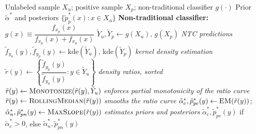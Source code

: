 \documentclass{article}
\begin{document}
\begin{algorithm}[!h]
\renewcommand{\algorithmicrequire}{\textbf{Input:}} %
\renewcommand{\algorithmicensure}{\textbf{Output:}} %
	\caption{DEDPUL (difference-of-estimated-densities PU learning)} %
	\begin{algorithmic}[1] %
	    \REQUIRE
	    Unlabeled sample $X_{u}$; positive sample $X_{p}$;
	    non-traditional classifier $g(\cdot)$
	    \ENSURE
	    Prior $\tilde{\alpha}^{\ast}$ and posteriors $\{\tilde{p}_{p}^{\ast}(x):x\in X_{u}\}$
	    \STATE \textbf{Non-traditional classifier:} $g(x)\equiv \dfrac{f_{x_{p}}(x)}{f_{x_{p}}(x)+f_{x_{u}}(x)}$ %
	    \STATE $\tilde{Y}_{u},\tilde{Y}_{p}\leftarrow g(X_{u}),\,g(X_{p})$
	    \hfill \emph{NTC predictions} %
	    \STATE $\tilde{f}_{y_{u}}(y),\tilde{f}_{y_{p}}(y)\leftarrow \mathrm{kde}(\tilde{Y}_{u}),\,\mathrm{kde}(\tilde{Y}_{p})$
	    \hfill \emph{kernel density estimation} %
	    \STATE $\tilde{r}(y)\leftarrow \left\{\dfrac{\tilde{f}_{y_{p}}(y)}{\tilde{f}_{y_{u}}(y)}:y\in\tilde{Y}_{u}\right\}$
	    \hfill \emph{density ratios, sorted}
	    \STATE $\tilde{r}(y)\leftarrow \textsc{Monotonize}(\tilde{r}(y),\tilde{Y}_{u})$
	    \hfill \emph{enforces partial monotonicity of the ratio curve} %
	    \STATE $\tilde{r}(y)\leftarrow \textsc{RollingMedian}(\tilde{r}(y))$
	    \hfill \emph{smooths the ratio curve}
	    \STATE $\tilde{\alpha}_{c}^{\ast},\tilde{p}_{pc}^{\ast}(y)\leftarrow \textsc{EM}(\tilde{r}(y))$;\quad
	    $\tilde{\alpha}_{n}^{\ast},\tilde{p}_{pn}^{\ast}(y)\leftarrow \textsc{MaxSlope}(\tilde{r}(y))$
	    \hfill \emph{estimates priors and posteriors} %
	    \RETURN $\tilde{\alpha}_{c}^{\ast},\tilde{p}_{pc}^{\ast}(y)$ if $\tilde{\alpha}_{c}^{\ast}>0$,
	    else $\tilde{\alpha}_{n}^{\ast},\tilde{p}_{pn}^{\ast}(y)$
	\end{algorithmic}
\end{algorithm}
\end{document}
